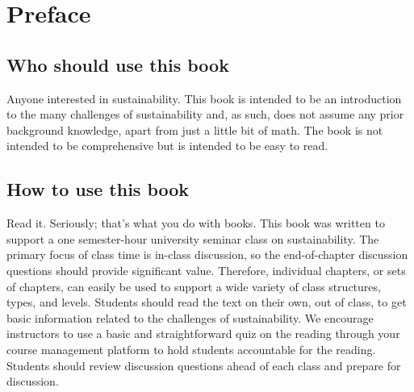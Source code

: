 

{
\pagestyle{plain}
\tableofcontents
}

\clearpage
 
 
 
 
\blankpage

{
\chapter*{Preface}
\thispagestyle{plain}

\noindent
\section*{Who should use this book} Anyone interested in sustainability. 
This book is intended to be an introduction to the many challenges of 
sustainability and, as such, does not assume any prior background knowledge,
apart from just a little bit of math.
The book is not intended to be comprehensive but is intended to be easy to read.\\

\section*{How to use this book} Read it. Seriously; that's what you do with books.
This book was written to support a one semester-hour university seminar class
on sustainability. The primary focus of class time is in-class discussion, so 
the end-of-chapter discussion questions should provide significant value. 
Therefore, individual chapters, or sets of chapters, can easily be
used to support a wide variety of class structures, types, and levels.
Students should read the text on their own, out of class, to get 
basic information related to  the challenges of sustainability. We encourage 
instructors to use a basic and straightforward quiz on the reading through your 
course management platform to hold students accountable for the reading. 
Students should review discussion questions ahead of each class and 
prepare for discussion. \\

}
